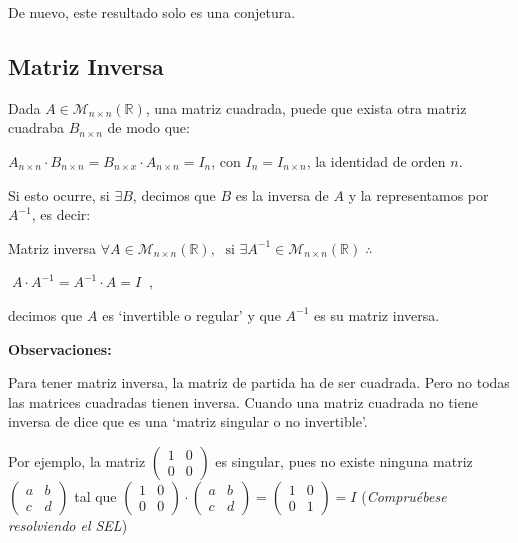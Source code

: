 \begin{ejem}
De nuevo, este resultado solo es una conjetura.
	
\end{ejem}


\subsection{Matriz Inversa}

\begin{defi}

Dada $A\in \mathcal M_{n\times n} (\mathbb R)$, una matriz cuadrada, puede que exista otra matriz cuadraba $B_{n\times n}$ de modo que:

$A_{n\times n}\cdot B_{n \times n}= B_{n\times x}\cdot A_{n \times n}=I_n$, con $I_n=I_{n\times n}$, la identidad de orden $n$.

Si esto ocurre, si $\exists B$, decimos que $B$ es la inversa de $A$ y la representamos por $A^{-1}$, es decir:




\begin{myblock}{Matriz inversa}
\vspace{2mm} $\forall A\in \mathcal M_{n\times n} (\mathbb R), \; \text{ si } \exists A^{-1}\in \mathcal M_{n\times n} (\mathbb R) \; \therefore \; $

\vspace{3mm} \centerline{$\boxed{\; A\cdot A^{-1}=A^{-1}\cdot A=I\; }\; $,} 

\vspace{2mm} decimos que $A$ es `invertible o regular' y que $A^{-1}$ es su matriz inversa. 
\end{myblock}

\end{defi}

\noindent \textbf{Observaciones:}

Para tener matriz inversa, la matriz de partida ha de ser cuadrada. Pero no todas las matrices cuadradas tienen inversa. Cuando una matriz cuadrada no tiene inversa de dice que es una `matriz singular o no invertible'.

Por ejemplo, la matriz $\left( \begin{matrix} 1&0\\0&0  \end{matrix}\right)$ es singular, pues no existe ninguna matriz $\left( \begin{matrix} a&b\\c&d  \end{matrix}\right)$ tal que $ \left( \begin{matrix} 1&0\\0&0  \end{matrix}\right)\cdot \left( \begin{matrix} a&b\\c&d  \end{matrix}\right)  =\left( \begin{matrix}1&0\\0&1   \end{matrix}\right)=I$ (\textit{Compruébese resolviendo el SEL})

